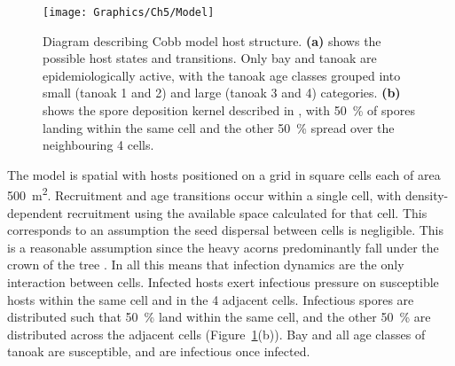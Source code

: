 \begin{figure}
\centering
    \texttt{[image: Graphics/Ch5/Model]}
    \caption[Mixed stand model structure]{Diagram describing Cobb model host structure. \textbf{(a)} shows the possible host states and transitions. Only bay and tanoak are epidemiologically active, with the tanoak age classes grouped into small (tanoak 1 and 2) and large (tanoak 3 and 4) categories. \textbf{(b)} shows the spore deposition kernel described in \citet{cobb_ecosystem_2012}, with \SI{50}{\percent} of spores landing within the same cell and the other \SI{50}{\percent} spread over the neighbouring 4 cells.\label{fig:ch5:model_description}}
\end{figure}

The model is spatial with hosts positioned on a grid in square cells each of area \SI{500}{\meter\squared}. Recruitment and age transitions occur within a single cell, with density-dependent recruitment using the available space calculated for that cell. This corresponds to an assumption the seed dispersal between cells is negligible. This is a reasonable assumption since the heavy acorns predominantly fall under the crown of the tree \citep{tappeiner_lithocarpus_1990}. In all this means that infection dynamics are the only interaction between cells. Infected hosts exert infectious pressure on susceptible hosts within the same cell and in the 4 adjacent cells. Infectious spores are distributed such that \SI{50}{\percent} land within the same cell, and the other \SI{50}{\percent} are distributed across the adjacent cells (Figure~\ref{fig:ch5:model_description}(b)). Bay and all age classes of tanoak are susceptible, and are infectious once infected.

